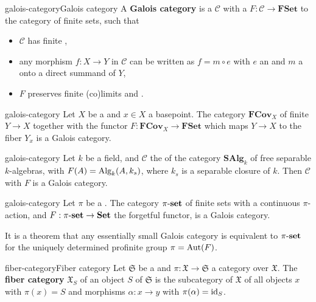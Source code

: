\begin{topic}{galois-category}{Galois category}
    A \textbf{Galois category} is a  $\mathcal{C}$ with a  $F : \mathcal{C} \to \textbf{FSet}$ to the category of finite sets, such that
    \begin{itemize}
        \item $\mathcal{C}$ has finite ,
        \item any morphism $f : X \to Y$ in $\mathcal{C}$ can be written as $f = m \circ e$ with $e$ an  and $m$ a  onto a direct summand of $Y$,
        \item $F$ preserves finite (co)limits and .
    \end{itemize}
\end{topic}

\begin{example}{galois-category}
    Let $X$ be a   and $x \in X$ a basepoint. The category $\textbf{FCov}_X$ of finite  $Y \to X$ together with the functor $F : \textbf{FCov}_X \to \textbf{FSet}$ which maps $Y \to X$ to the fiber $Y_x$ is a Galois category.
\end{example}

\begin{example}{galois-category}
    Let $k$ be a field, and $\mathcal{C}$ the  of the category $\textbf{SAlg}_k$ of free separable $k$-algebras, with $F(A) = \textup{Alg}_k(A, k_s)$, where $k_s$ is a separable closure of $k$. Then $\mathcal{C}$ with $F$ is a Galois category.
\end{example}

\begin{example}{galois-category}
    Let $\pi$ be a . The category $\pi\textup{-}\textbf{set}$ of finite sets with a continuous $\pi$-action, and $F : \pi\textup{-}\textbf{set} \to \textbf{Set}$ the forgetful functor, is a Galois category.
    
    It is a theorem that any essentially small Galois category is equivalent to $\pi\textup{-}\textbf{set}$ for the uniquely determined profinite group $\pi = \textup{Aut}(F)$.
\end{example}

\begin{topic}{fiber-category}{Fiber category}
    Let $\mathfrak{S}$ be a  and $\pi : \mathfrak{X} \to \mathfrak{S}$ a category over $\mathfrak{X}$. The \textbf{fiber category} $\mathfrak{X}_S$ of an object $S$ of $\mathfrak{S}$ is the subcategory of $\mathfrak{X}$ of all objects $x$ with $\pi(x) = S$ and morphisms $\alpha : x \to y$ with $\pi(\alpha) = \textup{id}_S$.
\end{topic}


